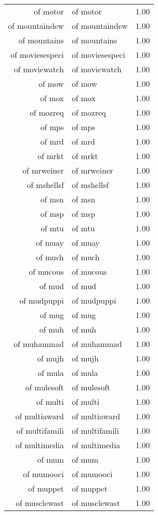 \begin{table}[ht]
\begin{tabular}{rlr}
  of motor & of motor & 1.00 \\ 
  of mountaindew & of mountaindew & 1.00 \\ 
  of mountains & of mountains & 1.00 \\ 
  of moviesespeci & of moviesespeci & 1.00 \\ 
  of moviewatch & of moviewatch & 1.00 \\ 
  of mow & of mow & 1.00 \\ 
  of mox & of mox & 1.00 \\ 
  of mozreq & of mozreq & 1.00 \\ 
  of mps & of mps & 1.00 \\ 
  of mrd & of mrd & 1.00 \\ 
  of mrkt & of mrkt & 1.00 \\ 
  of mrweiner & of mrweiner & 1.00 \\ 
  of mshellsf & of mshellsf & 1.00 \\ 
  of msn & of msn & 1.00 \\ 
  of msp & of msp & 1.00 \\ 
  of mtu & of mtu & 1.00 \\ 
  of muay & of muay & 1.00 \\ 
  of much & of much & 1.00 \\ 
  of mucous & of mucous & 1.00 \\ 
  of mud & of mud & 1.00 \\ 
  of mudpuppi & of mudpuppi & 1.00 \\ 
  of mug & of mug & 1.00 \\ 
  of muh & of muh & 1.00 \\ 
  of muhammad & of muhammad & 1.00 \\ 
  of mujh & of mujh & 1.00 \\ 
  of mula & of mula & 1.00 \\ 
  of mulesoft & of mulesoft & 1.00 \\ 
  of multi & of multi & 1.00 \\ 
  of multiaward & of multiaward & 1.00 \\ 
  of multifamili & of multifamili & 1.00 \\ 
  of multimedia & of multimedia & 1.00 \\ 
  of mum & of mum & 1.00 \\ 
  of mumooci & of mumooci & 1.00 \\ 
  of muppet & of muppet & 1.00 \\ 
  of musclewast & of musclewast & 1.00 \\ 

\end{tabular}
\end{table}
